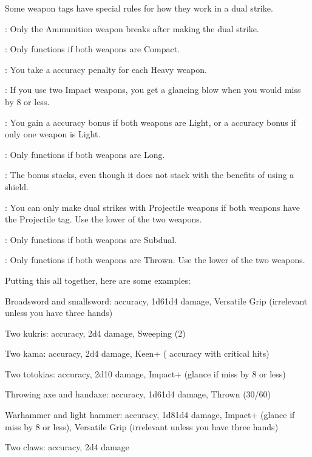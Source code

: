     Some weapon tags have special rules for how they work in a dual strike.
    \begin{raggeditemize}
      \item {}: Only the Ammunition weapon breaks after making the dual strike.
      \item {}: Only functions if both weapons are Compact.
      \item {}: You take a  accuracy penalty for each Heavy weapon.
      \item {}: If you use two Impact weapons, you get a glancing blow when you would miss by 8 or less.
      \item {}: You gain a  accuracy bonus if both weapons are Light, or a  accuracy bonus if only one weapon is Light.
      \item {}: Only functions if both weapons are Long.
      \item {}: The bonus stacks, even though it does not stack with the benefits of using a shield.
      \item {}: You can only make dual strikes with Projectile weapons if both weapons have the Projectile tag. Use the lower  of the two weapons.
      \item {}: Only functions if both weapons are Subdual.
      \item {}: Only functions if both weapons are Thrown. Use the lower  of the two weapons.
    \end{raggeditemize}

    Putting this all together, here are some examples:
    \begin{raggeditemize}
      \item Broadsword and smallsword:  accuracy, 1d6\plus1d4 damage, Versatile Grip (irrelevant unless you have three hands)
      \item Two kukris:  accuracy, 2d4 damage, Sweeping (2)
      \item Two kama:  accuracy, 2d4 damage, Keen+ ( accuracy with critical hits)
      \item Two totokias:  accuracy, 2d10 damage, Impact+ (glance if miss by 8 or less)
      \item Throwing axe and handaxe:  accuracy, 1d6\plus1d4 damage, Thrown (30/60)
      \item Warhammer and light hammer:  accuracy, 1d8\plus1d4 damage, Impact+ (glance if miss by 8 or less), Versatile Grip (irrelevant unless you have three hands)
      \item Two claws:  accuracy, 2d4 damage
    \end{raggeditemize}

